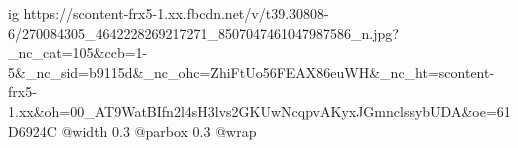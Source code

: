  
 
 
 
 

\ifcmt
  ig https://scontent-frx5-1.xx.fbcdn.net/v/t39.30808-6/270084305_4642228269217271_8507047461047987586_n.jpg?_nc_cat=105&ccb=1-5&_nc_sid=b9115d&_nc_ohc=ZhiFtUo56FEAX86euWH&_nc_ht=scontent-frx5-1.xx&oh=00_AT9WatBIfn2l4sH3lvs2GKUwNcqpvAKyxJGmnclssybUDA&oe=61D6924C
  @width 0.3
  @parbox 0.3
  @wrap \parpic[l]
\fi
